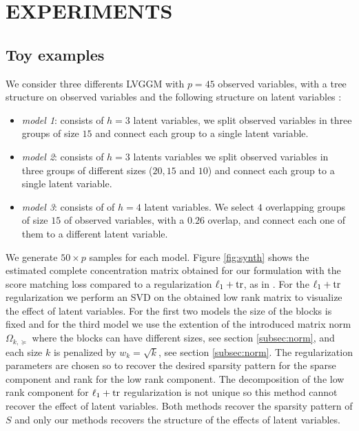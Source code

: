 \documentclass[letterpaper]{article}
\begin{document}
\section{EXPERIMENTS}
\label{experiments}
\subsection{Toy examples}

We consider three differents LVGGM with $p=45$ observed variables, with a tree structure on observed variables and the following structure on latent variables :
\begin{itemize}
\item \textit{model 1}: consists of $h=3$ latent variables, we split observed variables in three groups of size $15$ and connect each group to a single latent variable.
\item \textit{model 2}: consists of $h=3$ latents variables we split observed variables in three groups of different sizes ($20,15$ and $10$) and connect each group to a single latent variable.
\item \textit{model 3}: consists of of $h=4$ latent variables. We select $4$ overlapping groups of size $15$ of observed variables, with a $0.26$ overlap, and connect each one of them to a different latent variable.
\end{itemize}


We generate $50\times p$ samples for each model. Figure \ref{fig:synth} shows the estimated complete concentration matrix obtained for our formulation with the score matching loss compared to a regularization $\ell_1+{\rm tr}$, as in \citet{chandrasekaran2010}. For  the $\ell_1+{\rm tr}$ regularization we perform an SVD on the obtained low rank matrix to visualize the effect of latent variables. For the first two models the size of the blocks is fixed and for the third model we use the extention of the introduced matrix norm $\Omega_{k,\succeq}$ where the blocks can have different sizes, see section \ref{subsec:norm},  and each size $k$ is penalized by $w_{k}=\sqrt{k}$, see section \ref{subsec:norm}. The regularization parameters are chosen so to recover the desired sparsity pattern for the sparse component and rank for the low rank component.  The decomposition of the low rank component for $\ell_1+{\rm tr}$ regularization is not unique so this method cannot recover the effect of latent variables. Both methods recover the sparsity pattern of $S$ and only our methods recovers the structure of the effects of latent variables.
\end{document}
